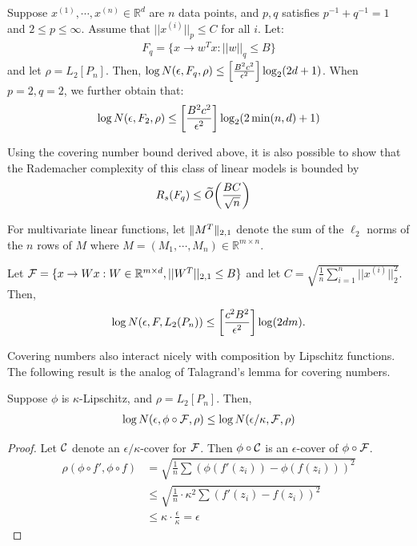 \begin{theorem}
Suppose $x^{(1)}, \cdots, x^{(n)} \in \mathbb{R}^d$ are $n$ data points, and $p, q$ satisfies $p^{-1} + q^{-1} = 1$ and $2 \le p \le \infty$. Assume that $||x^{(i)}||_p \le C$ for all $i$. Let:
\begin{align}
    F_q = \{x \to w^T x : ||w||_q \le B\}
\end{align}
and let $\rho = L_2[P_n]$. Then, $\log N(\epsilon, F_q, \rho) \le \left [\frac{B^2c^2}{\epsilon^2}\right ] \log_2 (2d + 1)$. When $p = 2, q = 2$, we further obtain that:
\begin{align}
    \log N(\epsilon, F_2, \rho) \le \left [\frac{B^2c^2}{\epsilon^2} \right ] \log_2 (2 \min (n, d ) + 1)
\end{align}
\end{theorem}
\begin{remark}
Using the covering number bound derived above, it is also possible to show that the Rademacher complexity of this class of linear models is bounded by
\begin{align}
    R_s(F_q) &\le \widetilde{O}{\left( \frac{BC}{\sqrt{n}} \right)}
\end{align} 
\end{remark}
For multivariate linear functions, let $\|M^T\|_{2,1}$ denote the sum of the $\ell_2$ norms of the $n$ rows of $M$ where $M = (M_1, \cdots, M_n) \in \mathbb{R}^{m \times n}$. 
\begin{theorem}
Let $\mathcal F = \{x \to Wx : W \in \mathbb{R}^{m \times d}, ||W^T||_{2, 1} \le B\}$ and let $C = \sqrt{\frac{1}{n} \sum_{i = 1}^n ||x^{(i)}||_2^2}$. Then, 
\begin{equation}
\log N(\epsilon, F, L_2(P_n)) \le \left [\frac{c^2B^2}{\epsilon^2} \right ] \log (2dm).
\end{equation}
\end{theorem}

Covering numbers also interact nicely with composition by Lipschitz functions. The following result is the analog of Talagrand's lemma for covering numbers.
\begin{lemma} Suppose $\phi$ is $\kappa$-Lipschitz, and $\rho = L_2[P_n]$. Then,
    \begin{align}
        \log N(\epsilon, \phi \circ \mathcal F, \rho) \le \log N(\epsilon / \kappa, \mathcal F, \rho) \label{lec9:eqn:covering-num-lipschitz}
    \end{align}
\end{lemma}
\begin{proof}
Let $\mathcal C$ denote an $\epsilon/\kappa$-cover for $\mathcal F$. Then $\phi \circ \mathcal C$ is an $\epsilon$-cover of $\phi \circ \mathcal F$.
\begin{align}
\rho(\phi \circ f', \phi \circ f) &= \sqrt{\frac{1}{n} \sum (\phi(f'(z_i)) - \phi(f(z_i)))^2} \\ 
&\le \sqrt{\frac{1}{n} \cdot \kappa^2 \sum(f'(z_i) - f(z_i))^2}\\
&\le \kappa \cdot \frac{\epsilon}{\kappa} = \epsilon
\end{align}
\end{proof}


